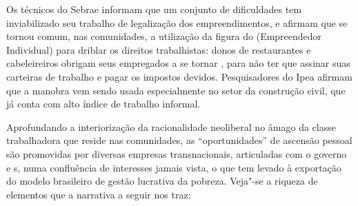 Os técnicos do Sebrae informam que um conjunto de dificuldades tem
inviabilizado seu trabalho de legalização dos empreendimentos, e afirmam
que se tornou comum, nas comunidades, a utilização da figura do 
(Empreendedor Individual) para driblar os direitos trabalhistas: donos
de restaurantes e cabeleireiros obrigam seus empregados a se tornar ,
para não ter que assinar suas carteiras de trabalho e pagar os impostos
devidos. Pesquisadores do Ipea afirmam que a manobra vem sendo usada
especialmente no setor da construção civil, que já conta com alto índice
de trabalho informal.

Aprofundando a interiorização da racionalidade neoliberal no âmago da
classe trabalhadora que reside nas comunidades, as ``oportunidades'' de
ascensão pessoal são promovidas por diversas empresas transnacionais,
articuladas com o governo e s, numa confluência de interesses jamais
vista, o que tem levado à exportação do modelo brasileiro de gestão
lucrativa da pobreza. Veja"-se a riqueza de elementos que a narrativa a
seguir nos traz:

